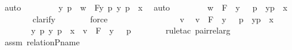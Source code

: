 \begin{isabellebody}
\ auto\ \isanewline
\ \ \ \ \isamarkupfalse%
\ \isamarkupfalse%
\ y\ p\ \ {\isachardoublequoteopen}w\ {\isacharequal}{\kern0pt}\ {\isacharless}{\kern0pt}F{\isacharbackquote}{\kern0pt}y{\isacharcomma}{\kern0pt}\ {\isasympi}{\isacharbackquote}{\kern0pt}p{\isachargreater}{\kern0pt}{\isachardoublequoteclose}\ {\isachardoublequoteopen}{\isacharless}{\kern0pt}y{\isacharcomma}{\kern0pt}\ p{\isachargreater}{\kern0pt}\ {\isasymin}\ x{\isachardoublequoteclose}\ \isamarkupfalse%
\ auto\ \isanewline
\ \ \ \ \isamarkupfalse%
\ \isamarkupfalse%
\ {\isachardoublequoteopen}w\ {\isasymin}\ {\isacharbraceleft}{\kern0pt}{\isasymlangle}F\ {\isacharbackquote}{\kern0pt}\ y{\isacharcomma}{\kern0pt}\ {\isasympi}\ {\isacharbackquote}{\kern0pt}\ p{\isasymrangle}\ {\isachardot}{\kern0pt}\ {\isasymlangle}y{\isacharcomma}{\kern0pt}p{\isasymrangle}\ {\isasymin}\ x{\isacharbraceright}{\kern0pt}{\isachardoublequoteclose}\ \isanewline
\ \ \ \ \ \ \isamarkupfalse%
\ clarify\isanewline
\ \ \ \ \ \ \isamarkupfalse%
\ force\isanewline
\ \ \ \ \ \ \isamarkupfalse%
\isanewline
\ \ \isamarkupfalse%
\ \isanewline
\ \ \ \ \isamarkupfalse%
\ v\ \isamarkupfalse%
\ {\isachardoublequoteopen}v\ {\isasymin}\ {\isacharbraceleft}{\kern0pt}{\isasymlangle}F\ {\isacharbackquote}{\kern0pt}\ y{\isacharcomma}{\kern0pt}\ {\isasympi}\ {\isacharbackquote}{\kern0pt}\ p{\isasymrangle}\ {\isachardot}{\kern0pt}\ {\isasymlangle}y{\isacharcomma}{\kern0pt}p{\isasymrangle}\ {\isasymin}\ x{\isacharbraceright}{\kern0pt}{\isachardoublequoteclose}\ \ \isanewline
\ \ \ \ \isamarkupfalse%
\ \isamarkupfalse%
\ {\isachardoublequoteopen}{\isasymexists}y\ p{\isachardot}{\kern0pt}\ {\isacharless}{\kern0pt}y{\isacharcomma}{\kern0pt}\ p{\isachargreater}{\kern0pt}\ {\isasymin}\ x\ {\isasymand}\ v\ {\isacharequal}{\kern0pt}\ {\isasymlangle}F\ {\isacharbackquote}{\kern0pt}\ y{\isacharcomma}{\kern0pt}\ {\isasympi}\ {\isacharbackquote}{\kern0pt}\ p{\isasymrangle}{\isachardoublequoteclose}\ \isanewline
\ \ \ \ \ \ \isamarkupfalse%
{\isacharparenleft}{\kern0pt}rule{\isacharunderscore}{\kern0pt}tac\ pair{\isacharunderscore}{\kern0pt}rel{\isacharunderscore}{\kern0pt}arg{\isacharparenright}{\kern0pt}\isanewline
\ \ \ \ \ \ \isamarkupfalse%
\ assm\ relation{\isacharunderscore}{\kern0pt}P{\isacharunderscore}{\kern0pt}name\ \isanewline
\ \ \ \ \ \ \isamarkupfalse%

\end{isabellebody}

